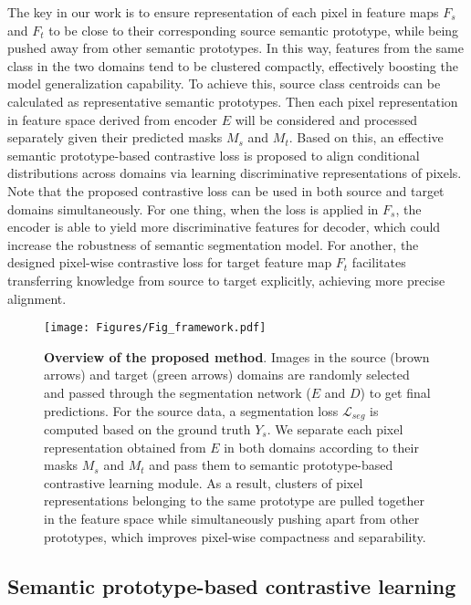 \documentclass[runningheads]{llncs}
\newcommand{\Lm}{\mathcal{L}}
\begin{document}
The key in our work is to ensure representation of each pixel in feature maps $F_s$ and $F_t$ to be close to their corresponding source semantic prototype, while being pushed away from other semantic prototypes. In this way, features from the same class in the two domains tend to be clustered compactly, effectively boosting the model generalization capability. 
To achieve this, source class centroids can be calculated as representative semantic prototypes. Then each pixel representation in feature space derived from encoder $E$ will be considered and processed separately given their predicted masks $M_s$ and $M_t$. Based on this, an effective semantic prototype-based contrastive loss is proposed to align conditional distributions across domains via learning discriminative representations of pixels. Note that the proposed contrastive loss can be used in both source and target domains simultaneously. For one thing, when the loss is applied in $F_s$, the encoder is able to yield more discriminative features for decoder, which could increase the robustness of semantic segmentation model. For another, the designed pixel-wise contrastive loss for target feature map $F_t$ facilitates transferring knowledge from source to target explicitly, achieving more precise alignment.


\begin{figure*}[t]
    \centering
    \texttt{[image: Figures/Fig\_framework.pdf]}\caption{{\bf Overview of the proposed method}. Images in the source (\textcolor[RGB]{197, 90, 17}{brown} arrows) and target (\textcolor[RGB]{84, 193, 53}{green} arrows) domains are randomly selected and passed through the segmentation network ($E$ and $D$) to get final predictions. For the source data, a segmentation loss $\Lm_{seg}$ is computed based on the ground truth $Y_s$. We separate each pixel representation obtained from $E$ in both domains according to their masks $M_{s}$ and $M_t$ and pass them to semantic prototype-based contrastive learning module. As a result, clusters of pixel representations belonging to the same prototype are pulled together in the feature space while simultaneously pushing apart from other prototypes, which improves pixel-wise compactness and separability.}
\label{Fig_framework}
\end{figure*}
\subsection{Semantic prototype-based contrastive learning}
\end{document}
